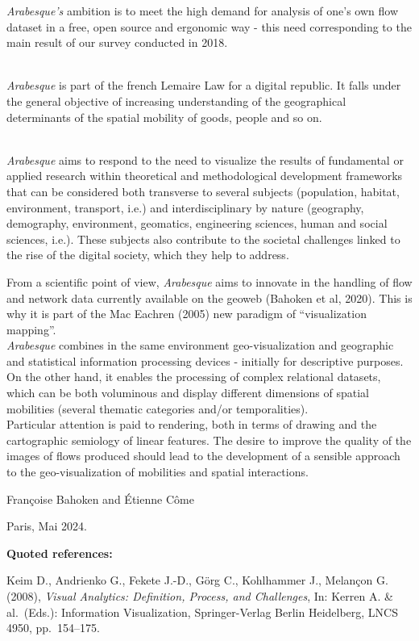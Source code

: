 \documentclass[
  letterpaper,
  DIV=11,
  numbers=noendperiod]{scrreprt}
\begin{document}
\emph{Arabesque's} ambition is to meet the high demand for analysis of
one's own flow dataset in a free, open source and ergonomic way - this
need corresponding to the main result of our survey conducted in 2018.\\
\strut \\
\emph{Arabesque} is part of the french Lemaire Law for a digital
republic. It falls under the general objective of increasing
understanding of the geographical determinants of the spatial mobility
of goods, people and so on.\\
\strut \\
\emph{Arabesque} aims to respond to the need to visualize the results of
fundamental or applied research within theoretical and methodological
development frameworks that can be considered both transverse to several
subjects (population, habitat, environment, transport, i.e.) and
interdisciplinary by nature (geography, demography, environment,
geomatics, engineering sciences, human and social sciences, i.e.). These
subjects also contribute to the societal challenges linked to the rise
of the digital society, which they help to address.

From a scientific point of view, \emph{Arabesque} aims to innovate in
the handling of flow and network data currently available on the geoweb
(Bahoken et al, 2020). This is why it is part of the Mac Eachren (2005)
new paradigm of ``visualization mapping''.\\
\emph{Arabesque} combines in the same environment geo-visualization and
geographic and statistical information processing devices - initially
for descriptive purposes. On the other hand, it enables the processing
of complex relational datasets, which can be both voluminous and display
different dimensions of spatial mobilities (several thematic categories
and/or temporalities).\\
Particular attention is paid to rendering, both in terms of drawing and
the cartographic semiology of linear features. The desire to improve the
quality of the images of flows produced should lead to the development
of a sensible approach to the geo-visualization of mobilities and
spatial interactions.

Françoise Bahoken and Étienne Côme

Paris, Mai 2024.

\textbf{Quoted references:}

Keim D., Andrienko G., Fekete J.-D., Görg C., Kohlhammer J., Melançon G.
(2008), \emph{Visual Analytics: Definition, Process, and Challenges},
In: Kerren A. \& al.~(Eds.): Information Visualization, Springer-Verlag
Berlin Heidelberg, LNCS 4950, pp.~154--175.
\end{document}
